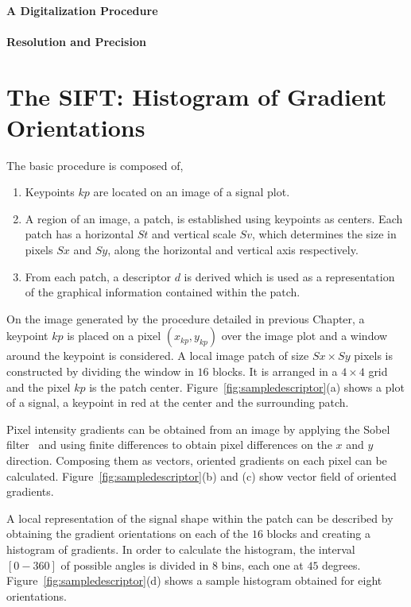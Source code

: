 \documentclass[review]{elsarticle}
\begin{document}
\paragraph{A Digitalization Procedure} 

\paragraph{Resolution and Precision} 



\section{The SIFT: Histogram of Gradient Orientations}
\label{SIFT}


The basic procedure is composed of,

\begin{enumerate}
\item Keypoints $kp$ are located on an image of a signal plot.
\item A region of an image, a patch, is established using keypoints as centers.  Each patch has a horizontal $St$ and vertical scale $Sv$, which determines the size in pixels $Sx$ and $Sy$,  along the horizontal and vertical axis respectively. 
\item From each patch, a descriptor $d$ is derived which is used as a representation of the graphical information contained within the patch.
\end{enumerate}

On the image generated by the procedure detailed in previous Chapter, a keypoint $kp$ is placed on a pixel $(x_{kp}, y_{kp})$ over the image plot and a window around the keypoint is considered. A local image patch of size $Sx \times Sy$ pixels is constructed by dividing the window in $16$ blocks. It is arranged in a $4 \times 4$ grid and the pixel $kp$ is the patch center.  Figure~\ref{fig:sampledescriptor}(a) shows a plot of a signal, a keypoint in red at the center and the surrounding patch.

Pixel intensity gradients can be obtained from an image by applying the Sobel filter~\cite{Szeliski2010} and using finite differences to obtain pixel differences on the $x$ and $y$ direction.  Composing them as vectors, oriented gradients on each pixel can be calculated.  Figure~\ref{fig:sampledescriptor}(b) and (c) show vector field of oriented gradients.

A local representation of the signal shape within the patch can be described by obtaining the gradient orientations on each of the $16$ blocks and creating a histogram of gradients.  In order to calculate the histogram, the interval $[0-360]$ of possible angles is divided in $8$ bins, each one at $45$ degrees.  Figure~\ref{fig:sampledescriptor}(d) shows a sample histogram obtained for eight orientations.
\end{document}
